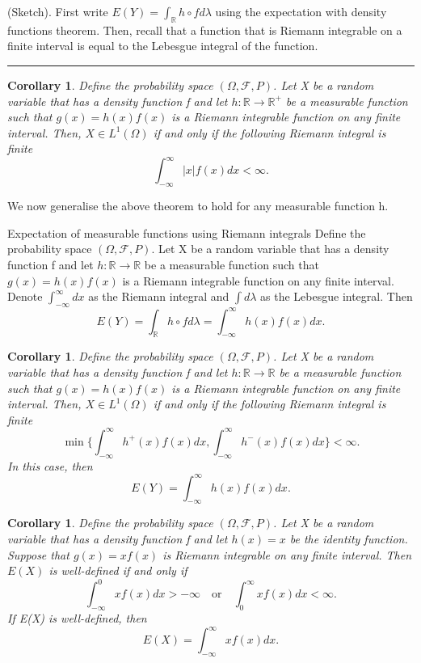 \documentclass[twoside]{article}
\newtheorem{corollary}[theorem]{Corollary}
\newenvironment{proof}{{\bf Proof:}}{\hfill\rule{2mm}{2mm}}
\newcommand{\sigmalgebra}{\mathcal{F}}
\begin{document}
\begin{proof}(Sketch). First write $E(Y) = \int_{\mathbb{R}}h\circ fd\lambda$ using the expectation with density functions theorem. Then, recall that a function that is Riemann integrable on a finite interval is equal to the Lebesgue integral of the function.
\end{proof}


\begin{corollary}Define the probability space $(\Omega, \sigmalgebra, P)$. Let X be a random variable that has a density function f and let $h: \mathbb{R} \rightarrow \mathbb{R}^+$ be a measurable function such that $g(x) = h(x)f(x)$ is a Riemann integrable function on any finite interval. Then, $X \in L^{1}(\Omega)$ if and only if the following Riemann integral is finite 
$$
\int_{-\infty}^{\infty}|x|f(x)dx < \infty.
$$
\end{corollary}

We now generalise the above theorem to hold for any measurable function h.


\begin{theorem_exam}{Expectation of measurable functions using Riemann integrals}{} Define the probability space $(\Omega, \sigmalgebra, P)$. Let X be a random variable that has a density function f and let $h: \mathbb{R} \rightarrow \mathbb{R}$ be a measurable function such that $g(x) = h(x)f(x)$ is a Riemann integrable function on any finite interval. Denote $\int_{-\infty}^{\infty}dx$ as the Riemann integral and $\int d\lambda$ as the Lebesgue integral. Then 
$$
E(Y) = \int_{\mathbb{R}}h\circ fd\lambda = \int_{-\infty}^{\infty}h(x)f(x)dx.
$$
\end{theorem_exam}


\begin{corollary}Define the probability space $(\Omega, \sigmalgebra, P)$. Let X be a random variable that has a density function f and let $h: \mathbb{R} \rightarrow \mathbb{R}$ be a measurable function such that $g(x) = h(x)f(x)$ is a Riemann integrable function on any finite interval. Then, $X \in L^{1}(\Omega)$ if and only if the following Riemann integral is finite 
$$
\min \bigg\{\int_{-\infty}^{\infty}h^+(x)f(x)dx,\int_{-\infty}^{\infty}h^-(x)f(x)dx \bigg \} < \infty.
$$
In this case, then 
$$
E(Y) = \int_{-\infty}^{\infty}h(x)f(x)dx.
$$
\end{corollary}


\begin{corollary}Define the probability space $(\Omega, \sigmalgebra, P)$. Let X be a random variable that has a density function f and let $h(x) = x$ be the identity function. Suppose that $g(x) = xf(x)$ is Riemann integrable on any finite interval. Then $E(X)$ is well-defined if and only if 
$$
\int_{-\infty}^{0}xf(x)dx > -\infty \quad \text{or} \quad \int_{0}^{\infty}xf(x)dx < \infty.
$$
If E(X) is well-defined, then 
$$
E(X) = \int_{-\infty}^{\infty}xf(x)dx.
$$
\end{corollary}
\end{document}
